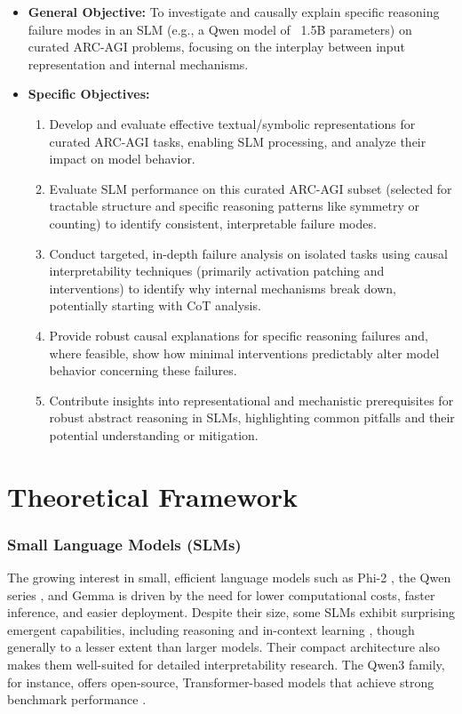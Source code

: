 \documentclass[12pt,a4paper]{article}
\begin{document}
\begin{itemize}
    \item \textbf{General Objective:} To investigate and causally explain specific reasoning failure modes in an SLM (e.g., a Qwen model of ~1.5B parameters) on curated ARC-AGI problems, focusing on the interplay between input representation and internal mechanisms.
    \item \textbf{Specific Objectives:}
    \begin{enumerate}
        \item Develop and evaluate effective textual/symbolic representations for curated ARC-AGI tasks, enabling SLM processing, and analyze their impact on model behavior.
        \item Evaluate SLM performance on this curated ARC-AGI subset (selected for tractable structure and specific reasoning patterns like symmetry or counting) to identify consistent, interpretable failure modes.
        \item Conduct targeted, in-depth failure analysis on isolated tasks using causal interpretability techniques (primarily activation patching and interventions) to identify why internal mechanisms break down, potentially starting with CoT analysis.
        \item Provide robust causal explanations for specific reasoning failures and, where feasible, show how minimal interventions predictably alter model behavior concerning these failures.
        \item Contribute insights into representational and mechanistic prerequisites for robust abstract reasoning in SLMs, highlighting common pitfalls and their potential understanding or mitigation.
    \end{enumerate}
\end{itemize}

\section*{Theoretical Framework}

\subsubsection*{Small Language Models (SLMs)}  
The growing interest in small, efficient language models such as Phi-2 \parencite{microsoft2023phi2}, the Qwen series \parencite{qwen2025qwen25technicalreport}, and Gemma \parencite{google2024gemma} is driven by the need for lower computational costs, faster inference, and easier deployment. Despite their size, some SLMs exhibit surprising emergent capabilities, including reasoning and in-context learning \parencite{brown2020languagemodelsfewshotlearners}, though generally to a lesser extent than larger models. Their compact architecture also makes them well-suited for detailed interpretability research. The Qwen3 family, for instance, offers open-source, Transformer-based \parencite{vaswani2017attention} models that achieve strong benchmark performance \parencite{qwen3_blog}.
\end{document}
